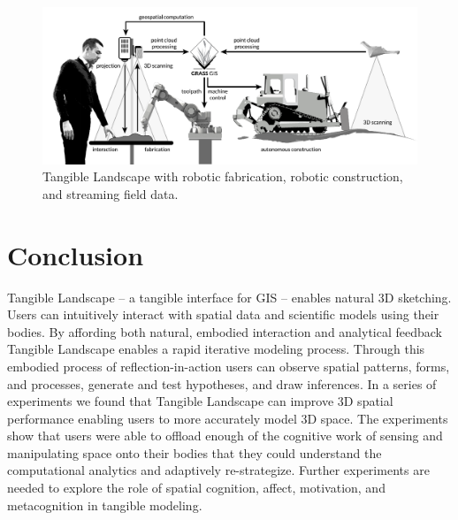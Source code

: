 \documentclass[prodmode,acmtochi]{acmsmall} %
\begin{document}
\begin{figure}
\begin{center}
\includegraphics[width=\textwidth]{images/system_schema_land.pdf}
\caption{Tangible Landscape with 
robotic fabrication, robotic construction, and streaming field data.}
\label{fig:system_schema_land}
\end{center}
\end{figure}

\section{Conclusion}

% 
%


Tangible Landscape -- a tangible interface for GIS -- 
enables natural 3D sketching. %
%
Users can intuitively interact with 
spatial data and scientific models using their bodies. 
% 
By affording both natural, embodied interaction and analytical feedback
Tangible Landscape enables a
rapid iterative modeling process.
%
Through this embodied process of reflection-in-action 
users can 
observe spatial patterns, forms, and processes, 
generate and test hypotheses, 
and draw inferences. 
%
In a series of experiments we found that 
Tangible Landscape can improve 3D spatial performance  
enabling users to more accurately model 3D space. 
%
The experiments show that users 
were able to offload enough of the cognitive work 
of sensing and manipulating space
onto their bodies
that they could understand the
computational analytics
and adaptively re-strategize.
%
Further experiments are needed
to explore the role of 
spatial cognition, affect, motivation, and metacognition 
in tangible modeling.
\end{document}

